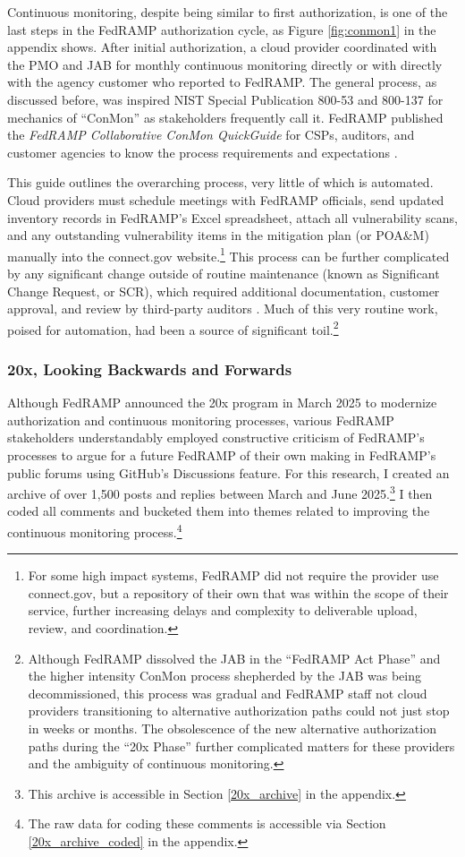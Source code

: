 \documentclass{jdf}
\begin{document}
Continuous monitoring, despite being similar to first authorization, is one of the last steps in the FedRAMP authorization cycle, as Figure \ref{fig:conmon1} in the appendix shows. After initial authorization, a cloud provider coordinated with the PMO and JAB for monthly continuous monitoring directly or with directly with the agency customer who reported to FedRAMP. The general process, as discussed before, was inspired NIST Special Publication 800-53 and 800-137 for mechanics of ``ConMon'' as stakeholders frequently call it. FedRAMP published the \textit{FedRAMP Collaborative ConMon QuickGuide} for CSPs, auditors, and customer agencies to know the process requirements and expectations \citeyear{fedramp_cmqg23}.

This guide outlines the overarching process, very little of which is automated. Cloud providers must schedule meetings with FedRAMP officials, send updated inventory records in FedRAMP's Excel spreadsheet, attach all vulnerability scans, and any outstanding vulnerability items in the mitigation plan (or POA\&M) manually into the connect.gov website.\footnote{For some high impact systems, FedRAMP did not require the provider use connect.gov, but a repository of their own that was within the scope of their service, further increasing delays and complexity to deliverable upload, review, and coordination.} This process can be further complicated by any significant change outside of routine maintenance (known as Significant Change Request, or SCR), which required additional documentation, customer approval, and review by third-party auditors \cite{fedramp_cmqg23}. Much of this very routine work, poised for automation, had been a source of significant toil.\footnote{Although FedRAMP dissolved the JAB in the ``FedRAMP Act Phase'' and the higher intensity ConMon process shepherded by the JAB was being decommissioned, this process was gradual and FedRAMP staff not cloud providers transitioning to alternative authorization paths could not just stop in weeks or months. The obsolescence of the new alternative authorization paths during the ``20x Phase'' further complicated matters for these providers and the ambiguity of continuous monitoring.}

\subsubsection{20x, Looking Backwards and Forwards} \label{20x}

Although FedRAMP announced the 20x program in March 2025 to modernize authorization and continuous monitoring processes, various FedRAMP stakeholders understandably employed constructive criticism of FedRAMP's processes to argue for a future FedRAMP of their own making in FedRAMP's public forums using GitHub's Discussions feature. For this research, I created an archive of over 1,500 posts and replies between March and June 2025.\footnote{This archive is accessible in Section \ref{20x_archive} in the appendix.} I then coded all comments and bucketed them into themes related to improving the continuous monitoring process.\footnote{The raw data for coding these comments is accessible via Section \ref{20x_archive_coded} in the appendix.}
\end{document}
